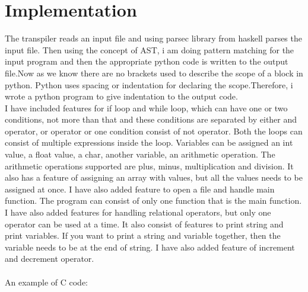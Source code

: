 \documentclass{article}
\begin{document}
\section{Implementation}
The transpiler reads an input file and using parsec library from haskell parses the input file. Then using the concept of AST, i am doing pattern matching for the input program and then the appropriate python code is written to the output file.Now as we know there are no brackets used to describe the scope of a block in python. Python uses spacing or indentation for declaring the scope.Therefore, i wrote a python program to give indentation to the output code.
\\
I have included features for if loop and while loop, which can have one or two conditions, not more than that and these conditions are separated by either and operator, or operator or one condition consist of not operator. Both the loops can consist of multiple expressions inside the loop. Variables can be assigned an int value, a float value, a char, another variable, an arithmetic operation. The arithmetic operations supported are plus, minus, multiplication and division. It also has a feature of assigning an array with values, but all the values needs to be assigned at once. I have also added feature to open a file and handle main function. The program can consist of only one function that is the main function. I have also added features for handling relational operators, but only one operator can be used at a time. It also consist of features to print string and print variables. If you want to print a string and variable together, then the variable needs to be at the end of string. I have also added feature of increment and decrement operator.\cite{lecture} \\
\\
An example of C code:\\
\end{document}
